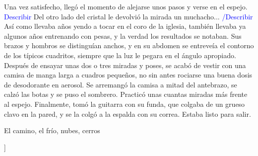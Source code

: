 Una vez satisfecho, llegó el momento de alejarse unos pasos y verse en el espejo.
\textcolor{blue}{Describir} Del otro lado del cristal le devolvió la mirada un muchacho...
\textcolor{blue}{/Describir}
Así como llevaba años yendo a tocar en el coro de la iglesia, también llevaba ya algunos años entrenando con pesas,
y la verdad los resultados se notaban.
Sus brazos y hombros se distinguían anchos, y en su abdomen se entreveía el contorno de los típicos cuadritos, siempre que la luz le pegara en el ángulo apropiado.
Después de ensayar unas dos o tres miradas y poses, se acabó de vestir con una camisa de manga larga a cuadros pequeños, no sin antes rociarse una buena dosis de desodorante en aerosol.
Se arremangó la camisa a mitad del antebrazo, se calzó las botas y se puso el sombrero.
Practicó unas cuantas miradas más frente al espejo. Finalmente, tomó la guitarra
con su funda, que colgaba de un grueso clavo en la pared, y se la colgó a la espalda con su correa. Estaba listo para salir.

\froufrou[dinkus]

El camino, el frío, nubes, cerros

\froufrou[\pgfornament[height=.1cm]{87}\hspace{-2pt}\hspace{-2pt}]









